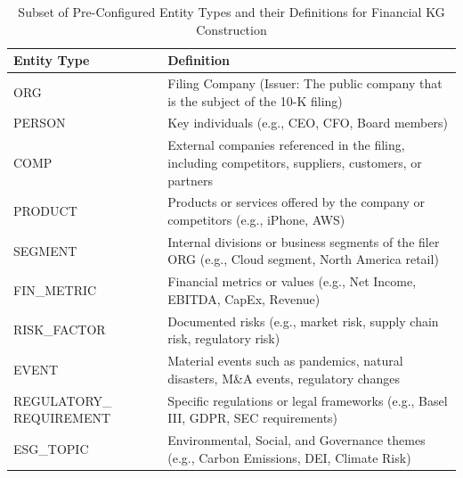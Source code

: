 
\begin{table}[htbp]
\small
\renewcommand{\arraystretch}{1.2}
\centering
\caption{Subset of Pre-Configured Entity Types and their Definitions for Financial KG Construction}
\label{tab:entity_types}
\begin{tabularx}{\columnwidth}{|>{\hsize=0.3\hsize\raggedright\arraybackslash}X|>{\hsize=0.7\hsize\raggedright\arraybackslash}X|}
\hline
\textbf{Entity Type} & \textbf{Definition} \\
\hline
ORG & Filing Company (Issuer: The public company that is the subject of the 10-K filing) \\
\hline
PERSON & Key individuals (e.g., CEO, CFO, Board members) \\
\hline
COMP & External companies referenced in the filing, including competitors, suppliers, customers, or partners \\
\hline
PRODUCT & Products or services offered by the company or competitors (e.g., iPhone, AWS) \\
\hline
SEGMENT & Internal divisions or business segments of the filer ORG (e.g., Cloud segment, North America retail) \\
\hline
FIN\_METRIC & Financial metrics or values (e.g., Net Income, EBITDA, CapEx, Revenue) \\
\hline
RISK\_FACTOR & Documented risks (e.g., market risk, supply chain risk, regulatory risk) \\
\hline
EVENT & Material events such as pandemics, natural disasters, M\&A events, regulatory changes \\
\hline
REGULATORY\_ REQUIREMENT & Specific regulations or legal frameworks (e.g., Basel III, GDPR, SEC requirements) \\
\hline
ESG\_TOPIC & Environmental, Social, and Governance themes (e.g., Carbon Emissions, DEI, Climate Risk) \\
\hline
\end{tabularx}
\end{table}




